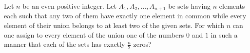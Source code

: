 Let $ n$ be an even positive integer. Let $ A_1, A_2, \ldots, A_{n + 1}$ be sets having $ n$
 elements each such that any two of them have exactly one element in 
common while every element of their union belongs to at least two of the
 given sets.
 For which $ n$ can one assign to every element of the union one of the numbers $0$ and $1$ in such a manner that each of the sets has exactly $ \frac {n}{2}$ zeros?
